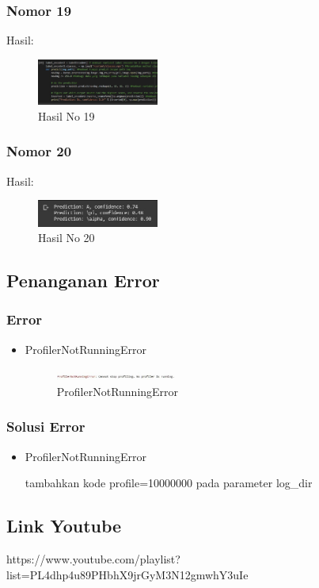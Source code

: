 \subsubsection{Nomor 19}
\hfill\break

Hasil:
\begin{figure}[H]
\centering
	\includegraphics[width=4cm]{figures/1174067/7/no19.jpg}
	\caption{Hasil No 19}
\end{figure}

\subsubsection{Nomor 20}
\hfill\break

Hasil:
\begin{figure}[H]
\centering
	\includegraphics[width=4cm]{figures/1174067/7/no20.jpg}
	\caption{Hasil No 20}
\end{figure}
\subsection{Penanganan Error}
\subsubsection{Error}
\hfill\break
\begin{itemize}
\item ProfilerNotRunningError

\begin{figure}[H]
\centering
	\includegraphics[width=4cm]{figures/1174067/7/error1.jpg}
\caption{ProfilerNotRunningError}
\end{figure}
\end{itemize}
\subsubsection{Solusi Error}
\hfill\break
\begin{itemize}
\item ProfilerNotRunningError

tambahkan kode profile=10000000 pada parameter log\_dir
\end{itemize}

\subsection{Link Youtube}
https://www.youtube.com/playlist?list=PL4dhp4u89PHbhX9jrGyM3N12gmwhY3uIe